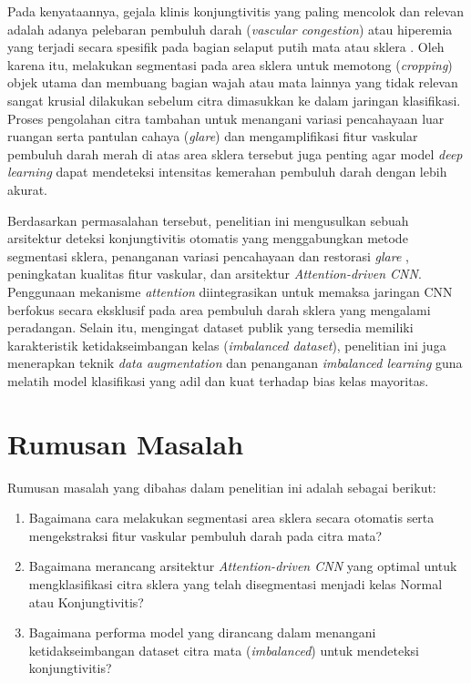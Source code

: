 Pada kenyataannya, gejala klinis konjungtivitis yang paling mencolok dan relevan adalah adanya pelebaran pembuluh darah (\textit{vascular congestion}) atau hiperemia yang terjadi secara spesifik pada bagian selaput putih mata atau sklera \parencite{madhusudhan2026deep}. Oleh karena itu, melakukan segmentasi pada area sklera untuk memotong (\textit{cropping}) objek utama dan membuang bagian wajah atau mata lainnya yang tidak relevan sangat krusial dilakukan sebelum citra dimasukkan ke dalam jaringan klasifikasi. Proses pengolahan citra tambahan untuk menangani variasi pencahayaan luar ruangan serta pantulan cahaya (\textit{glare}) \parencite{fuentes2025illumination} dan mengamplifikasi fitur vaskular pembuluh darah merah di atas area sklera tersebut juga penting agar model \textit{deep learning} dapat mendeteksi intensitas kemerahan pembuluh darah dengan lebih akurat.

Berdasarkan permasalahan tersebut, penelitian ini mengusulkan sebuah arsitektur deteksi konjungtivitis otomatis yang menggabungkan metode segmentasi sklera, penanganan variasi pencahayaan dan restorasi \textit{glare} \parencite{fuentes2025illumination}, peningkatan kualitas fitur vaskular, dan arsitektur \textit{Attention-driven CNN}. Penggunaan mekanisme \textit{attention} \parencite{sangeethaa2024enhanced,jiang2023automatic} diintegrasikan untuk memaksa jaringan CNN berfokus secara eksklusif pada area pembuluh darah sklera yang mengalami peradangan. Selain itu, mengingat dataset publik yang tersedia memiliki karakteristik ketidakseimbangan kelas (\textit{imbalanced dataset}), penelitian ini juga menerapkan teknik \textit{data augmentation} dan penanganan \textit{imbalanced learning} guna melatih model klasifikasi yang adil dan kuat terhadap bias kelas mayoritas.

\section{Rumusan Masalah}
\label{sec:rumusan-masalah}

Rumusan masalah yang dibahas dalam penelitian ini adalah sebagai berikut:
\begin{enumerate}[itemsep=1pt]
  \item Bagaimana cara melakukan segmentasi area sklera secara otomatis serta mengekstraksi fitur vaskular pembuluh darah pada citra mata?
  \item Bagaimana merancang arsitektur \textit{Attention-driven CNN} yang optimal untuk mengklasifikasi citra sklera yang telah disegmentasi menjadi kelas Normal atau Konjungtivitis?
  \item Bagaimana performa model yang dirancang dalam menangani ketidakseimbangan dataset citra mata (\textit{imbalanced}) untuk mendeteksi konjungtivitis?
\end{enumerate}

